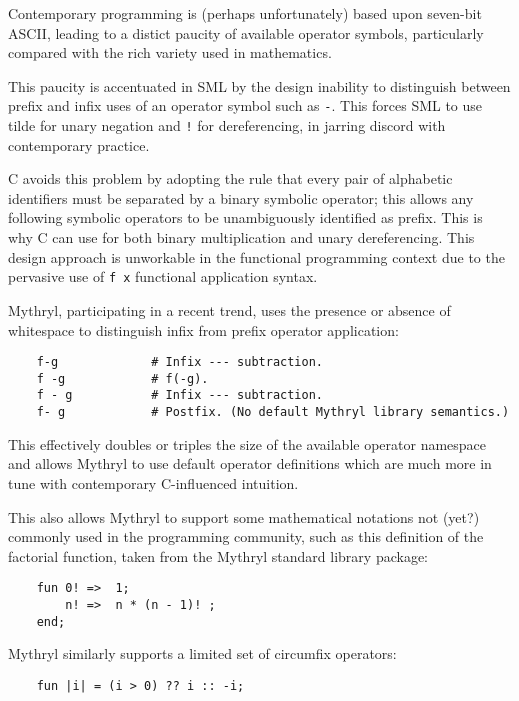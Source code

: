 Contemporary programming is (perhaps unfortunately) based upon seven-bit 
{\sc ASCII}, leading to a distict paucity of available operator symbols, 
particularly compared with the rich variety used in mathematics.

This paucity is accentuated in {\sc SML} by the design inability to 
distinguish between prefix and infix uses of an operator symbol such 
as {\tt -}.  This forces {\sc SML} to use tilde for unary negation 
and {\tt !} for dereferencing, in jarring discord with contemporary 
practice.

C avoids this problem by adopting the rule that every pair of alphabetic 
identifiers must be separated by a binary symbolic operator; this allows 
any following symbolic operators to be unambiguously identified as prefix. 
This is why C can use {\tt *} for both binary multiplication and unary 
dereferencing.  This design approach is unworkable in the functional 
programming context due to the pervasive use of {\tt f x} functional 
application syntax.

Mythryl, participating in a recent trend, uses the presence or absence 
of whitespace to distinguish infix from prefix operator application:

\begin{verbatim}
    f-g             # Infix --- subtraction.
    f -g            # f(-g).
    f - g           # Infix --- subtraction.
    f- g            # Postfix. (No default Mythryl library semantics.)
\end{verbatim}

This effectively doubles or triples the size of the available operator 
namespace and allows Mythryl to use default operator definitions which 
are much more in tune with contemporary C-influenced intuition.

This also allows Mythryl to support some mathematical notations not 
(yet?) commonly used in the programming community, such as this 
definition of the factorial function, taken from the Mythryl standard 
library  
package:

\begin{verbatim}
    fun 0! =>  1;
        n! =>  n * (n - 1)! ;
    end;
\end{verbatim}

Mythryl similarly supports a limited set of circumfix operators:

\begin{verbatim}
    fun |i| = (i > 0) ?? i :: -i;
\end{verbatim}


